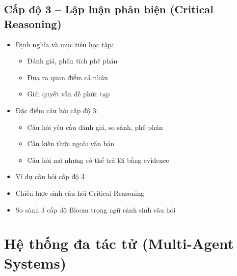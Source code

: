 \subsection{Cấp độ 3 -- Lập luận phản biện (Critical Reasoning)}
\begin{itemize}
    \item Định nghĩa và mục tiêu học tập:
    \begin{itemize}
        \item Đánh giá, phân tích phê phán
        \item Đưa ra quan điểm cá nhân
        \item Giải quyết vấn đề phức tạp
    \end{itemize}
    \item Đặc điểm câu hỏi cấp độ 3:
    \begin{itemize}
        \item Câu hỏi yêu cầu đánh giá, so sánh, phê phán
        \item Cần kiến thức ngoài văn bản
        \item Câu hỏi mở nhưng có thể trả lời bằng evidence
    \end{itemize}
    \item Ví dụ câu hỏi cấp độ 3
    \item Chiến lược sinh câu hỏi Critical Reasoning
    \item So sánh 3 cấp độ Bloom trong ngữ cảnh sinh câu hỏi
\end{itemize}

\section{Hệ thống đa tác tử (Multi-Agent Systems)}


